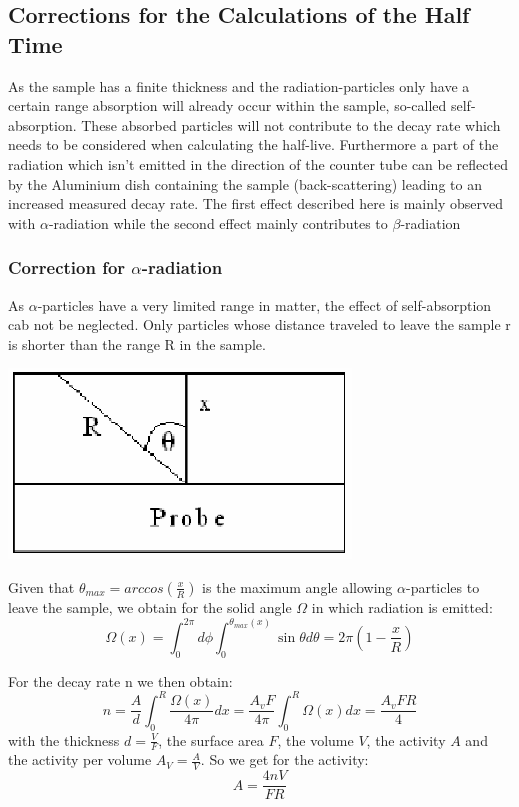 \documentclass[12pt]{article}
\begin{document}
 \subsection{Corrections for the Calculations of the Half Time}
 
 As the sample has a finite thickness and the radiation-particles only have a certain range absorption will already occur within the sample, so-called self-absorption. These absorbed particles will not contribute to the decay rate which needs to be considered when calculating the half-live. Furthermore a part of the radiation which isn't emitted in the direction of the counter tube can be reflected by the Aluminium dish containing the sample (back-scattering) leading to an increased measured decay rate.
The first effect described here is mainly observed with $\alpha$-radiation while the second effect mainly contributes to $\beta$-radiation


\subsubsection{Correction for $\alpha$-radiation}

As $\alpha$-particles have a very limited range in matter, the effect of self-absorption cab not be neglected. Only particles whose distance traveled to leave the sample r is shorter than the range R in the sample. 

%
\vskip0.5cm
\begin{minipage}{\textwidth}
	\centering
	\includegraphics[width=.25\textwidth]{figures/alpha-Korrektur.png}
\end{minipage}
\vskip0.5cm
Given that $\theta_{max}=arccos\left( \frac{x}{R}\right)$   is the maximum angle allowing $\alpha$-particles to leave the sample, we obtain for the 
solid angle $\Omega$ in which radiation is emitted:
\[\Omega(x)=\int_{0}^{2\pi}d\phi\int_{0}^{\theta_{max}(x)}\sin\theta d\theta = 2\pi\left( 1-\frac{x}{R}\right)\]

For the decay rate n we then obtain:
\[n= \frac{A}{d}\int_{0}^{R}\frac{\Omega(x)}{4\pi}dx = \frac{A_v F}{4\pi}\int_{0}^{R}\Omega(x)dx = \frac{A_v F R}{4}\]
with the thickness $d=\frac{V}{F}$, the surface area $F$, the volume $V$, the activity $A$ and the activity per volume $A_V=\frac{A}{V}$. So we get for the activity:
$$A=\frac{4nV}{FR}$$
\end{document}

